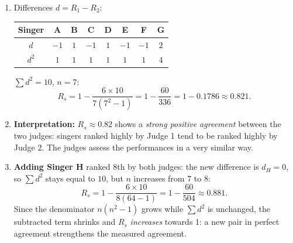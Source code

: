 \documentclass[11pt]{article}
\begin{document}
\begin{corrige}
\begin{enumerate}
\item Differences $d = R_1 - R_2$:
\begin{center}
\begin{tabular}{|c|c|c|c|c|c|c|c|}
\hline
Singer & A & B & C & D & E & F & G \\
\hline
$d$ & $-1$ & $1$ & $-1$ & $1$ & $-1$ & $-1$ & $2$ \\
\hline
$d^2$ & $1$ & $1$ & $1$ & $1$ & $1$ & $1$ & $4$ \\
\hline
\end{tabular}
\end{center}
$\sum d^2 = 10$, $n = 7$:
\[
R_s = 1 - \frac{6 \times 10}{7(7^2 - 1)} = 1 - \frac{60}{336} = 1 - 0.1786 \approx \boxed{0.821}.
\]
\item \textbf{Interpretation:} $R_s \approx 0.82$ shows a \emph{strong positive agreement} between the two judges: singers ranked highly by Judge 1 tend to be ranked highly by Judge 2. The judges assess the performances in a very similar way.
\item \textbf{Adding Singer H} ranked 8th by both judges: the new difference is $d_H = 0$, so $\sum d^2$ stays equal to $10$, but $n$ increases from 7 to 8:
\[
R_s = 1 - \frac{6 \times 10}{8(64-1)} = 1 - \frac{60}{504} \approx 0.881.
\]
Since the denominator $n(n^2-1)$ grows while $\sum d^2$ is unchanged, the subtracted term shrinks and $R_s$ \emph{increases} towards 1: a new pair in perfect agreement strengthens the measured agreement.
\end{enumerate}
\end{corrige}
\end{document}

